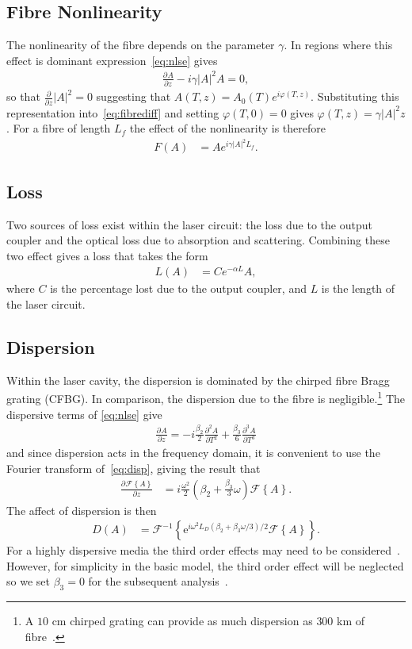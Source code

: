 \documentclass[12pt]{article}
\newcommand{\pdiff}[3][]{\frac{\partial^{#1}#2}{\partial{#3}^{#1}}}
\newcommand{\FT}[1]{\mathcal{F}\left\{ #1 \right\}}
\newcommand{\FTi}[1]{\mathcal{F}^{-1}\left\{ #1 \right\}}
\begin{document}
\subsection{Fibre Nonlinearity}
The nonlinearity of the fibre depends on the parameter $\gamma$. In regions where this effect is dominant expression~\eqref{eq:nlse} gives
\begin{align}
\label{eq:fibrediff}
	\pdiff{A}{z} - i \gamma |A|^2 A = 0,
\end{align}
so that $\frac{\partial}{\partial z} |A|^2 = 0$ suggesting that $A(T,z) = A_0(T) e^{i \varphi(T,z)}$. Substituting this representation into~\eqref{eq:fibrediff} and setting $\varphi(T,0)=0$ gives $\varphi(T,z) = \gamma |A|^2 z$. For a fibre of length $L_f$ the effect of the nonlinearity is therefore
\begin{align}
\label{eq:fibre}
	F(A) &= A e^{i \gamma |A|^2 L_f}.
\end{align}

\subsection{Loss}
Two sources of loss exist within the laser circuit: the loss due to the output coupler and the optical loss due to absorption and scattering. Combining these two effect gives a loss that takes the form
\begin{align}
\label{eq:fibreloss}
	L(A) &= C e^{- \alpha L}A,
\end{align}
where $C$ is the percentage lost due to the output coupler, and $L$ is the length of the laser circuit.

\subsection{Dispersion}
Within the laser cavity, the dispersion is dominated by the chirped fibre Bragg grating (CFBG). In comparison, the dispersion due to the fibre is negligible.\footnote{A $10$ cm chirped grating can provide as much dispersion as $300$ km of fibre~\cite{agrawal2002}.} The dispersive terms of \eqref{eq:nlse} give
\begin{align}
\label{eq:disp}
	\pdiff{A}{z} = -i \frac{\beta_2}{2} \pdiff[2]{A}{T} + \frac{\beta_3}{6} \pdiff[3]{A}{T}
\end{align}
and since dispersion acts in the frequency domain, it is convenient to use the Fourier transform of~\eqref{eq:disp}, giving the result that
\begin{align*}
	\pdiff{\FT{A}}{z} &= i\frac{\omega^2}{2}\left(\beta_2 + \frac{\beta_3}{3} \omega\right) \FT{A}.
\end{align*}
The affect of dispersion is then
\begin{align}
\label{eq:dispersion}
	D(A) &= \FTi{\textrm{e}^{i \omega^2 L_D(\beta_2 + \beta_3 \omega/3)/2} \FT{A}}.
\end{align}
For a highly dispersive media the third order effects may need to be considered~\cite{agrawal2013, litchinitser}. However, for simplicity in the basic model, the third order effect will be neglected so we set $\beta_3=0$ for the subsequent analysis~\cite{agrawal2013, ferreira}.
\end{document}
